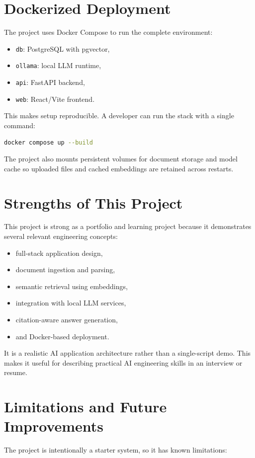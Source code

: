 \documentclass[11pt,a4paper]{article}
\begin{document}
\section{Dockerized Deployment}
The project uses Docker Compose to run the complete environment:

\begin{itemize}[leftmargin=1.5em]
    \item \texttt{db}: PostgreSQL with pgvector,
    \item \texttt{ollama}: local LLM runtime,
    \item \texttt{api}: FastAPI backend,
    \item \texttt{web}: React/Vite frontend.
\end{itemize}

This makes setup reproducible. A developer can run the stack with a single command:

\begin{lstlisting}[language=bash]
docker compose up --build
\end{lstlisting}

The project also mounts persistent volumes for document storage and model cache so uploaded files and cached embeddings are retained across restarts.

\section{Strengths of This Project}
This project is strong as a portfolio and learning project because it demonstrates several relevant engineering concepts:

\begin{itemize}[leftmargin=1.5em]
    \item full-stack application design,
    \item document ingestion and parsing,
    \item semantic retrieval using embeddings,
    \item integration with local LLM services,
    \item citation-aware answer generation,
    \item and Docker-based deployment.
\end{itemize}

It is a realistic AI application architecture rather than a single-script demo. This makes it useful for describing practical AI engineering skills in an interview or resume.

\section{Limitations and Future Improvements}
The project is intentionally a starter system, so it has known limitations:
\end{document}
